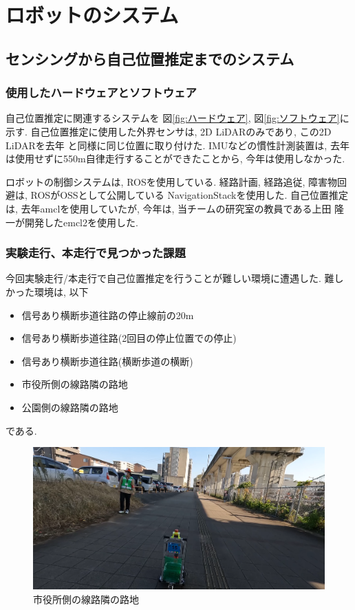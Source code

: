 \documentclass[twocolumn,9pt]{jsproceedings}
\begin{document}
\section{ロボットのシステム}

\subsection{センシングから自己位置推定までのシステム}

\subsubsection{使用したハードウェアとソフトウェア}

自己位置推定に関連するシステムを
図\ref{fig:ハードウェア}, 図\ref{fig:ソフトウェア}に示す. 
自己位置推定に使用した外界センサは, 2D LiDARのみであり,
この2D LiDARを去年\cite{去年のつくばチャレンジシンポジウム}
と同様に同じ位置に取り付けた.
IMUなどの慣性計測装置は, 去年は使用せずに550m自律走行することができたことから, 
今年は使用しなかった. 

ロボットの制御システムは, ROSを使用している. 
経路計画, 経路追従, 障害物回避は, ROSがOSSとして公開している
NavigationStackを使用した. 
自己位置推定は, 去年amclを使用していたが, 
今年は, 当チームの研究室の教員である上田 隆一が開発したemcl2を使用した. 

\subsubsection{実験走行、本走行で見つかった課題}

今回実験走行/本走行で自己位置推定を行うことが難しい環境に遭遇した. 
難しかった環境は, 以下
\begin{itemize}
  \item 信号あり横断歩道往路の停止線前の20m
  \item 信号あり横断歩道往路(2回目の停止位置での停止)
  \item 信号あり横断歩道往路(横断歩道の横断)
  \item 市役所側の線路隣の路地
  \item 公園側の線路隣の路地
\end{itemize}
である. 

\begin{figure}[h]
  \begin{center}
    \includegraphics[width=1.0\linewidth]{figs/city_hall_side_alley.pdf}
    \caption{市役所側の線路隣の路地}
    \label{fig:city_hall_side_alley}
  \end{center}
\end{figure}
\end{document}
